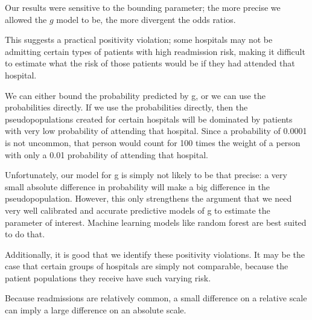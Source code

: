 \documentclass[]{article}\usepackage[]{graphicx}\usepackage[]{color}
\begin{document}


Our results were sensitive to the bounding parameter; the more precise we allowed the $g$ model to be, the more divergent the odds ratios. 

This suggests a practical positivity violation; some hospitals may not be admitting certain types of patients with high readmission risk, making it difficult to estimate what the risk of those patients would be if they had attended that hospital. 

We can either bound the probability predicted by g, or we can use the probabilities directly. If we use the probabilities directly, then the pseudopopulations created for certain hospitals will be dominated by patients with very low probability of attending that hospital. Since a probability of 0.0001 is not uncommon, that person would count for 100 times the weight of a person with only a 0.01 probability of attending that hospital. 

Unfortunately, our model for g is simply not likely to be that precise: a very small absolute difference in probability will make a big difference in the pseudopopulation. However, this only strengthens the argument that we need very well calibrated and accurate predictive models of g to estimate the parameter of interest. Machine learning models like random forest are best suited to do that.

Additionally, it is good that we identify these positivity violations. It may be the case that certain groups of hospitals are simply not comparable, because the patient populations they receive have such varying risk. 


Because readmissions are relatively common, a small difference on a relative scale can imply a large difference on an absolute scale.
\end{document}
